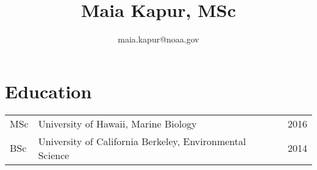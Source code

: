 \documentclass[10pt, letterpaper]{article}
\begin{document}
\title{Maia Kapur, MSc}
\author{maia.kapur@noaa.gov}

\maketitle
\vspace{-15mm}
\noindent\makebox[\linewidth]{\rule{\paperwidth}{0pt}}
\section*{Education}
\begin{tabular}{lll}

MSc & University of Hawaii, Marine Biology & 2016 \\
BSc & University of California Berkeley, Environmental Science & 2014 \\
\end{tabular}
\end{document}
